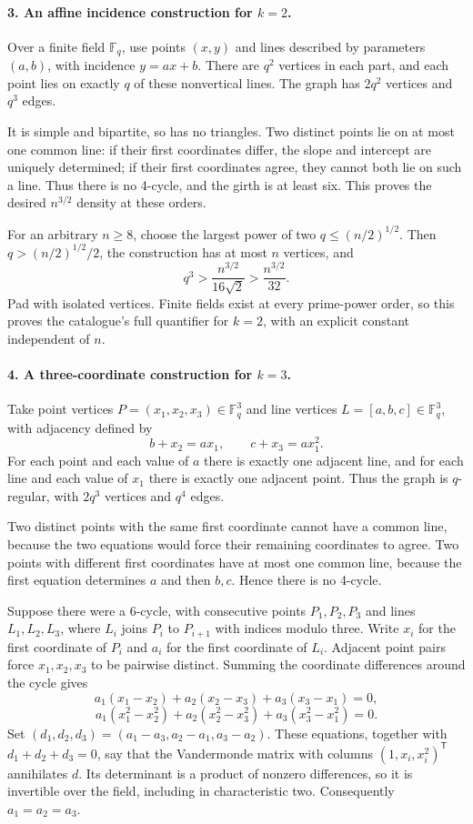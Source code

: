 \documentclass[11pt]{article}
\begin{document}
\paragraph{3. An affine incidence construction for $k=2$.}
Over a finite field $\mathbb F_q$, use points $(x,y)$ and lines described by parameters $(a,b)$, with incidence $y=ax+b$. There are $q^2$ vertices in each part, and each point lies on exactly $q$ of these nonvertical lines. The graph has $2q^2$ vertices and $q^3$ edges.

It is simple and bipartite, so has no triangles. Two distinct points lie on at most one common line: if their first coordinates differ, the slope and intercept are uniquely determined; if their first coordinates agree, they cannot both lie on such a line. Thus there is no 4-cycle, and the girth is at least six. This proves the desired $n^{3/2}$ density at these orders.

For an arbitrary $n\ge8$, choose the largest power of two $q\le(n/2)^{1/2}$. Then $q>(n/2)^{1/2}/2$, the construction has at most $n$ vertices, and
\[
 q^3>\frac{n^{3/2}}{16\sqrt2}>\frac{n^{3/2}}{32}.
\]
Pad with isolated vertices. Finite fields exist at every prime-power order, so this proves the catalogue's full quantifier for $k=2$, with an explicit constant independent of $n$.

\paragraph{4. A three-coordinate construction for $k=3$.}
Take point vertices $P=(x_1,x_2,x_3)\in\mathbb F_q^3$ and line vertices $L=[a,b,c]\in\mathbb F_q^3$, with adjacency defined by
\[
 b+x_2=ax_1,\qquad c+x_3=ax_1^2.
\]
For each point and each value of $a$ there is exactly one adjacent line, and for each line and each value of $x_1$ there is exactly one adjacent point. Thus the graph is $q$-regular, with $2q^3$ vertices and $q^4$ edges.

Two distinct points with the same first coordinate cannot have a common line, because the two equations would force their remaining coordinates to agree. Two points with different first coordinates have at most one common line, because the first equation determines $a$ and then $b,c$. Hence there is no 4-cycle.

Suppose there were a 6-cycle, with consecutive points $P_1,P_2,P_3$ and lines $L_1,L_2,L_3$, where $L_i$ joins $P_i$ to $P_{i+1}$ with indices modulo three. Write $x_i$ for the first coordinate of $P_i$ and $a_i$ for the first coordinate of $L_i$. Adjacent point pairs force $x_1,x_2,x_3$ to be pairwise distinct. Summing the coordinate differences around the cycle gives
\[
 a_1(x_1-x_2)+a_2(x_2-x_3)+a_3(x_3-x_1)=0,
\]
\[
 a_1(x_1^2-x_2^2)+a_2(x_2^2-x_3^2)+a_3(x_3^2-x_1^2)=0.
\]
Set $(d_1,d_2,d_3)=(a_1-a_3,a_2-a_1,a_3-a_2)$. These equations, together with $d_1+d_2+d_3=0$, say that the Vandermonde matrix with columns $(1,x_i,x_i^2)^{\mathsf T}$ annihilates $d$. Its determinant is a product of nonzero differences, so it is invertible over the field, including in characteristic two. Consequently $a_1=a_2=a_3$.
\end{document}
